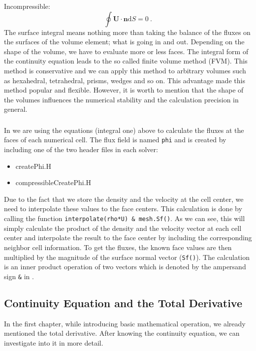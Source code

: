 	Incompressible:
%
%
\begin{equation}
 \boxed{
    \oint \textbf{U} \cdot \textbf{n} \mathrm{d}S = 0
   } ~.
\end{equation}
%
%
	The surface integral means nothing more than taking the balance of
    the fluxes on the surfaces of the volume element; what is going in
    and out. Depending on the shape of the volume, we have to evaluate
    more or less faces. The integral form of the continuity equation leads
    to the so called finite volume method (FVM). This method is conservative
    and we can apply this method to arbitrary volumes such as hexahedral,
    tetrahedral, prisms, wedges and so on. This advantage made this method
    popular and flexible. However, it is worth to mention that the shape
    of the volumes influences the numerical stability and the calculation
    precision in general.
%
%
%
%
%
\subsubsection{\OF}
%
%
	In \OF we are using the equations (integral one) above to calculate
    the fluxes at the faces of each numerical cell. The flux field is
    named \texttt{phi} and is created by including one of the two header
    files in each solver:
%
%
\begin{itemize}
 \item createPhi.H
 \item compressibleCreatePhi.H
\end{itemize}
%
%
	Due to the fact that we store the density and the velocity at the
    cell center, we need to interpolate these values to the face centers.
    This calculation is done by calling the function
    \texttt{interpolate(rho*U) \& mesh.Sf()}. As we can see, this will
    simply calculate the product of the density and the velocity vector
    at each cell center and interpolate the result to the face center by
    including the corresponding neighbor cell information. To get the fluxes,
    the known face values are then multiplied by the magnitude of the surface
    normal vector (\texttt{Sf()}). The calculation is an inner product
    operation of two vectors which is denoted by the ampersand sign
    \texttt{\&} in \OF.
%
%
%
%
%
\subsection{Continuity Equation and the Total Derivative}
%
%
	In the first chapter, while introducing basic mathematical operation,
    we already mentioned the total derivative. After knowing the continuity
    equation, we can investigate into it in more detail.

